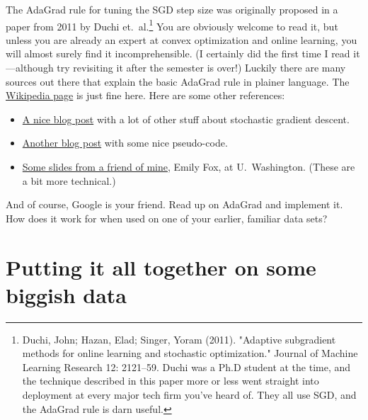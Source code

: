 \documentclass{mynotes}
\begin{document}
The AdaGrad rule for tuning the SGD step size was originally proposed in a paper from 2011 by Duchi et.~al.\footnote{Duchi, John; Hazan, Elad; Singer, Yoram (2011). "Adaptive subgradient methods for online learning and stochastic optimization."  Journal of Machine Learning Research 12: 2121--59.  Duchi was a Ph.D student at the time, and the technique described in this paper more or less went straight into deployment at every major tech firm you've heard of.  They all use SGD, and the AdaGrad rule is darn useful.}  You are obviously welcome to read it, but unless you are already an expert at convex optimization and online learning, you will almost surely find it incomprehensible.  (I certainly did the first time I read it---although try revisiting it after the semester is over!)  Luckily there are many sources out there that explain the basic AdaGrad rule in plainer language.  The \href{https://en.wikipedia.org/wiki/Stochastic_gradient_descent#AdaGrad}{Wikipedia page} is just fine here.  Here are some other references:
\begin{itemize}
\item \href{http://sebastianruder.com/optimizing-gradient-descent/index.html#adagrad}{A nice blog post} with a lot of other stuff about stochastic gradient descent.
\item \href{https://xcorr.net/2014/01/23/adagrad-eliminating-learning-rates-in-stochastic-gradient-descent/}{Another blog post} with some nice pseudo-code.
\item \href{https://courses.cs.washington.edu/courses/cse547/15sp/slides/adagrad.pdf}{Some slides from a friend of mine}, Emily Fox, at U.~Washington.  (These are a bit more technical.)
\end{itemize}
And of course, Google is your friend.  Read up on AdaGrad and implement it.  How does it work for when used on one of your earlier, familiar data sets?


\section{Putting it all together on some biggish data}
\end{document}
